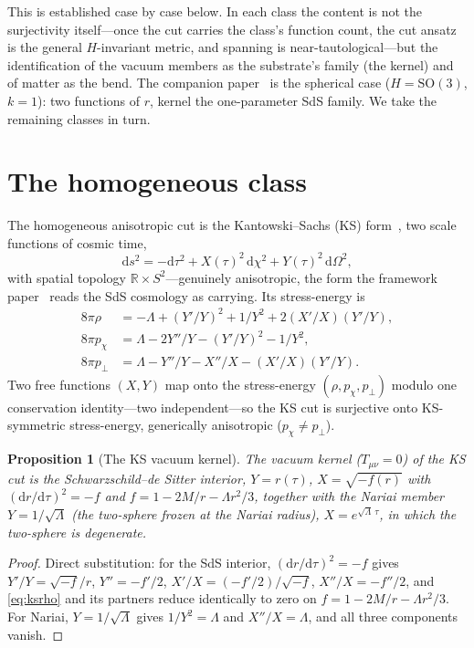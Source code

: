 \documentclass[11pt,a4paper]{article}
\newtheorem{proposition}[theorem]{Proposition}
\theoremstyle{definition}
\newcommand{\dd}{\mathrm{d}}
\begin{document}
This is established case by case below. In each class the content is not the surjectivity itself---once the cut carries the class's function count, the cut ansatz is the general $H$-invariant metric, and spanning is near-tautological---but the identification of the vacuum members as the substrate's family (the kernel) and of matter as the bend. The companion paper~\cite{JanzenOperator} is the spherical case ($H=\mathrm{SO}(3)$, $k=1$): two functions of $r$, kernel the one-parameter SdS family. We take the remaining classes in turn.

\section{The homogeneous class}\label{sec:homog}

The homogeneous anisotropic cut is the Kantowski--Sachs (KS) form~\cite{Kantowski1966}, two scale functions of cosmic time,
\begin{equation}\label{eq:ks}
\dd s^{2}=-\dd\tau^{2}+X(\tau)^{2}\,\dd\chi^{2}+Y(\tau)^{2}\,\dd\Omega^{2},
\end{equation}
with spatial topology $\mathbb{R}\times S^{2}$---genuinely anisotropic, the form the framework paper~\cite{JanzenCRframework} reads the SdS cosmology as carrying. Its stress-energy is
\begin{align}
8\pi\rho&=-\Lambda+(Y'/Y)^{2}+1/Y^{2}+2(X'/X)(Y'/Y),\label{eq:ksrho}\\
8\pi p_{\chi}&=\Lambda-2Y''/Y-(Y'/Y)^{2}-1/Y^{2},\\
8\pi p_{\perp}&=\Lambda-Y''/Y-X''/X-(X'/X)(Y'/Y).
\end{align}
Two free functions $(X,Y)$ map onto the stress-energy $(\rho,p_{\chi},p_{\perp})$ modulo one conservation identity---two independent---so the KS cut is surjective onto KS-symmetric stress-energy, generically anisotropic ($p_{\chi}\neq p_{\perp}$).

\begin{proposition}[The KS vacuum kernel]\label{prop:ksvac}
The vacuum kernel ($T_{\mu\nu}=0$) of the KS cut is the Schwarzschild--de Sitter interior, $Y=r(\tau)$, $X=\sqrt{-f(r)}$ with $(\dd r/\dd\tau)^{2}=-f$ and $f=1-2M/r-\Lambda r^{2}/3$, together with the Nariai member~\cite{Nariai1951} $Y=1/\sqrt{\Lambda}$ (the two-sphere frozen at the Nariai radius), $X=e^{\sqrt{\Lambda}\,\tau}$, in which the two-sphere is degenerate.
\end{proposition}

\begin{proof}
Direct substitution: for the SdS interior, $(\dd r/\dd\tau)^{2}=-f$ gives $Y'/Y=\sqrt{-f}/r$, $Y''=-f'/2$, $X'/X=(-f'/2)/\sqrt{-f}$, $X''/X=-f''/2$, and \eqref{eq:ksrho} and its partners reduce identically to zero on $f=1-2M/r-\Lambda r^{2}/3$. For Nariai, $Y=1/\sqrt{\Lambda}$ gives $1/Y^{2}=\Lambda$ and $X''/X=\Lambda$, and all three components vanish.
\end{proof}
\end{document}
